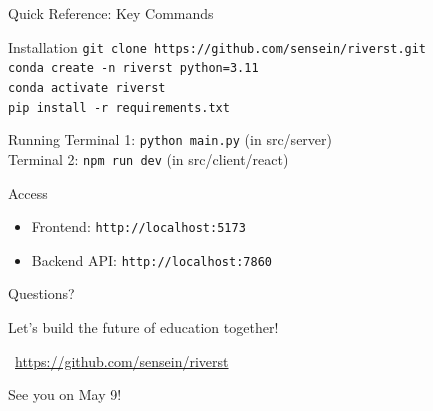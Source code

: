 \documentclass[aspectratio=169]{beamer}
\begin{document}
\begin{frame}{Quick Reference: Key Commands}
\begin{block}{Installation}
\small
\texttt{git clone https://github.com/sensein/riverst.git}\\
\texttt{conda create -n riverst python=3.11}\\
\texttt{conda activate riverst}\\
\texttt{pip install -r requirements.txt}
\end{block}

\begin{block}{Running}
\small
Terminal 1: \texttt{python main.py} (in src/server)\\
Terminal 2: \texttt{npm run dev} (in src/client/react)
\end{block}

\begin{block}{Access}
\begin{itemize}
    \item Frontend: \texttt{http://localhost:5173}
    \item Backend API: \texttt{http://localhost:7860}
\end{itemize}
\end{block}
\end{frame}

\begin{frame}
\begin{center}
\Huge Questions?

\vspace{1cm}

\Large Let's build the future of education together!

\vspace{1cm}

\normalsize
\faGithub\ \url{https://github.com/sensein/riverst}

\vspace{0.3cm}

See you on May 9!
\end{center}
\end{frame}
\end{document}
